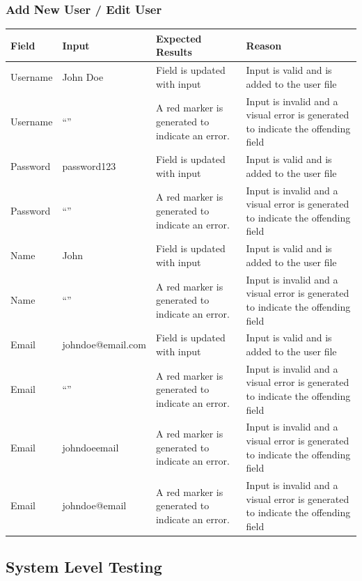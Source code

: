 \documentclass[oneside,openany,11pt,a4paper]{report}
\begin{document}
\subsubsection{Add New User / Edit User}
\begin{longtable}{|p{3cm}|p{3cm}|p{4.5cm}|p{4.5cm}|}
	\hline
	\rowcolor{gray!50}
	\textbf{Field} & \textbf{Input} &  \textbf{Expected Results} & \textbf{Reason} \\ \hline
	
	Username & John Doe &	Field is updated with input &	Input is valid and is added to the user file \\ \hline
	Username &	“” &	A red marker is generated to indicate an error.	& Input is invalid and a visual error is generated to indicate the offending field \\ \hline
	Password & password123 & Field is updated with input & Input is valid and is added to the user file \\ \hline
	Password & “” & A red marker is generated to indicate an error. & Input is invalid and a visual error is generated to indicate the offending field \\ \hline
	Name & John	& Field is updated with input &Input is valid and is added to the user file \\ \hline
	Name & “” & A red marker is generated to indicate an error. & Input is invalid and a visual error is generated to indicate the offending field \\ \hline
	Email &johndoe@email.com & Field is updated with input & Input is valid and is added to the user file \\ \hline
	Email & “” & A red marker is generated to indicate an error. & Input is invalid and a visual error is generated to indicate the offending field \\ \hline
	Email & johndoeemail & A red marker is generated to indicate an error. & Input is invalid and a visual error is generated to indicate the offending field \\ \hline
	Email & johndoe@email & A red marker is generated to indicate an error. & Input is invalid and a visual error is generated to indicate the offending field \\ \hline
	
\end{longtable}

\subsection{System Level Testing}
\end{document}
